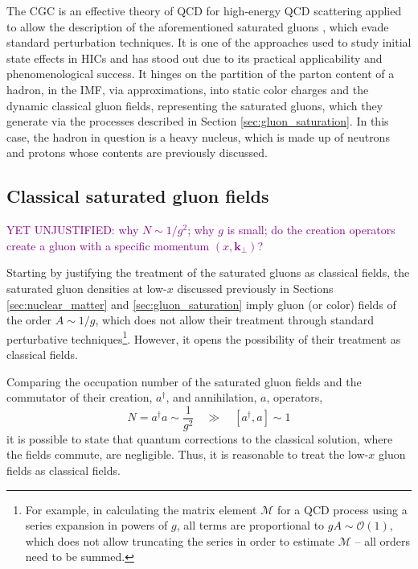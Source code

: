 The \gls{CGC} is an effective theory of \gls{QCD} for high-energy \gls{QCD} scattering applied to allow the description of the aforementioned saturated gluons \cite{Gelis_2010}, which evade standard perturbation techniques. It is one of the approaches used to study initial state effects in \glspl{HIC} and has stood out due to its practical applicability and phenomenological success.\cite{Albacete_2014} It hinges on the partition of the parton content of a hadron, in the \gls{IMF},
 via approximations, into static color charges and the dynamic classical gluon fields, representing the saturated gluons, which they generate via the processes described in Section \ref{sec:gluon_saturation}.\cite{Gelis_2010} In this case, the hadron in question is a heavy nucleus, which is made up of neutrons and protons whose contents are previously discussed.


\subsection{Classical saturated gluon fields}
\textcolor{purple}{YET UNJUSTIFIED: why $N \sim 1/g^2$; why $g$ is small; do the creation operators create a gluon with a specific momentum $(x,\mathbf{k}_\perp)$?}

Starting by justifying the treatment of the saturated gluons as classical fields, the saturated gluon densities at low-$x$ discussed previously in Sections \ref{sec:nuclear_matter} and \ref{sec:gluon_saturation} imply gluon (or color) fields of the order $A \sim 1/g$, which does not allow their treatment through standard perturbative techniques\footnote{For example, in calculating the matrix element $\mathcal{M}$ for a \gls{QCD} process using a series expansion in powers of $g$, all terms are proportional to $gA \sim \mathcal{O}(1)$, which does not allow truncating the series in order to estimate $\mathcal{M}$ -- all orders need to be summed.}.\cite{Albacete_2014} However, it opens the possibility of their treatment as classical fields. 

Comparing the occupation number of the saturated gluon fields and the commutator of their creation, $a^\dagger$, and annihilation, $a$, operators, \citep{Albacete_2014}
\begin{equation}
	N = a^\dagger a \sim \frac{1}{g^2} \quad \gg \quad [a^\dagger, a] \sim 1
\end{equation}
it is possible to state that quantum corrections to the classical solution, where the fields commute, are negligible. Thus, it is reasonable to treat the low-$x$ gluon fields as classical fields.

